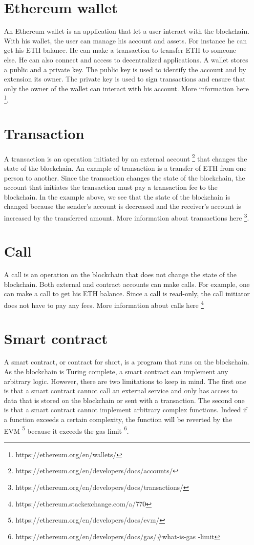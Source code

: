 \documentclass[a4paper,11pt,oneside]{report}
\begin{document}
\section{Ethereum wallet}
An Ethereum wallet is an application that let a user interact with the blockchain. With his wallet, the user can manage his account and assets. For instance he can get his ETH balance. He can make a transaction to transfer ETH to someone else. He can also connect and access to decentralized applications. A wallet stores a public and a private key. The public key is used to identify the account and by extension its owner. The private key is used to sign transactions and ensure that only the owner of the wallet can interact with his account. More information here \footnote{https://ethereum.org/en/wallets/}.

\section{Transaction}
A transaction is an operation initiated by an external account \footnote{https://ethereum.org/en/developers/docs/accounts/} that changes the state of the blockchain. An example of transaction is a transfer of ETH from one person to another. Since the transaction changes the state of the blockchain, the account that initiates the transaction must pay a transaction fee to the blockchain. In the example above, we see that the state of the blockchain is changed because the sender's account is decreased and the receiver's account is increased by the transferred amount. More information about transactions here \footnote{https://ethereum.org/en/developers/docs/transactions/}.

\section{Call}
A call is an operation on the blockchain that does not change the state of the blockchain. Both external and contract accounts can make calls. For example, one can make a call to get his ETH balance. Since a call is read-only, the call initiator does not have to pay any fees. More information about calls here \footnote{https://ethereum.stackexchange.com/a/770}

\section{Smart contract}
A smart contract, or contract for short, is a program that runs on the blockchain. As the blockchain is Turing complete, a smart contract can implement any arbitrary logic. However, there are two limitations to keep in mind. The first one is that a smart contract cannot call an external service and only has access to data that is stored on the blockchain or sent with a transaction. The second one is that a smart contract cannot implement arbitrary complex functions. Indeed if a function exceeds a certain complexity, the function will be reverted by the EVM \footnote{https://ethereum.org/en/developers/docs/evm/} because it exceeds the gas limit \footnote{https://ethereum.org/en/developers/docs/gas/#what-is-gas -limit }.
\end{document}
